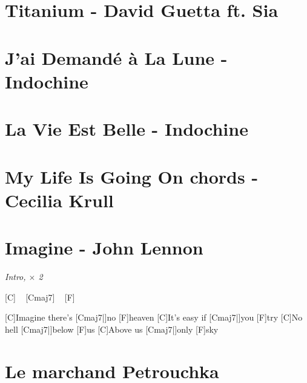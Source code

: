 \documentclass{guitartabs}
\begin{document}
\section*{Titanium - David Guetta ft. Sia}
\begin{guitar}

\end{guitar}



\section*{J'ai Demandé à La Lune - Indochine}
\begin{guitar}

\end{guitar}

\section*{La Vie Est Belle - Indochine}
\begin{guitar}

\end{guitar}


\section{My Life Is Going On chords - Cecilia Krull }
\begin{guitar}

\end{guitar}


\section{Imagine - John Lennon}

\begin{guitar}


\emph{Intro, $\times$ 2}%

[C] ~ [Cmaj7]  ~ [F]  ~  %

[C]Imagine there's [Cmaj7|]{no} [F]heaven
[C]It's easy if [Cmaj7|]{you} [F]try
[C]No hell [Cmaj7|]{below} [F]us
[C]Above us [Cmaj7|]{only} [F]sky
\end{guitar}


\section{Le marchand Petrouchka}
\begin{guitar}

\end{guitar}
\end{document}
